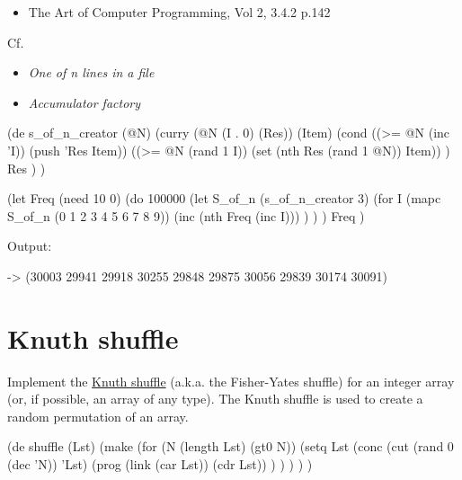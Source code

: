 \begin{itemize}
\item
  The Art of Computer Programming, Vol 2, 3.4.2 p.142
\end{itemize}

Cf.

\begin{itemize}
\item
  \emph{One of n lines in a file}
\item
  \emph{Accumulator factory}
\end{itemize}



\begin{wideverbatim}

(de s_of_n_creator (@N)
   (curry (@N (I . 0) (Res)) (Item)
      (cond
         ((>= @N (inc 'I)) (push 'Res Item))
         ((>= @N (rand 1 I)) (set (nth Res (rand 1 @N)) Item)) )
      Res ) )

(let Freq (need 10 0)
   (do 100000
      (let S_of_n (s_of_n_creator 3)
         (for I (mapc S_of_n (0 1 2 3 4 5 6 7 8 9))
            (inc (nth Freq (inc I))) ) ) )
   Freq )

Output:

-> (30003 29941 29918 30255 29848 29875 30056 29839 30174 30091)

\end{wideverbatim}

\pagebreak{}
\section*{Knuth shuffle}

Implement the \href{http://en.wikipedia.org/wiki/Knuth\_shuffle}{Knuth
shuffle} (a.k.a. the Fisher-Yates shuffle) for an integer array (or, if
possible, an array of any type). The Knuth shuffle is used to create a
random permutation of an array.

\begin{wideverbatim}

(de shuffle (Lst)
   (make
      (for (N (length Lst) (gt0 N))
         (setq Lst
            (conc
               (cut (rand 0 (dec 'N)) 'Lst)
               (prog (link (car Lst)) (cdr Lst)) ) ) ) ) )

\end{wideverbatim}



% 
